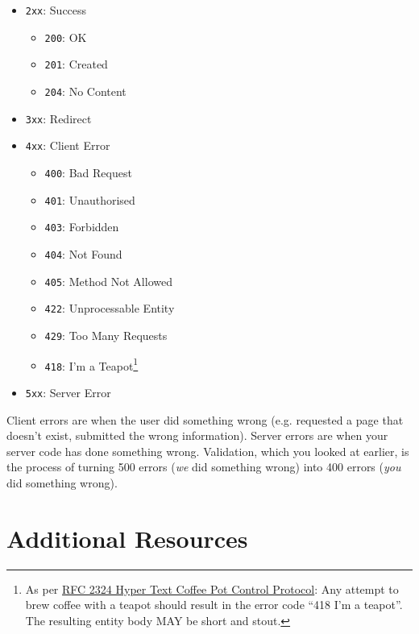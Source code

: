 \begin{itemize}
    \item \texttt{2xx}: Success
        \begin{itemize}
            \item \texttt{200}: OK
            \item \texttt{201}: Created
            \item \texttt{204}: No Content
        \end{itemize}

    \item \texttt{3xx}: Redirect

    \item \texttt{4xx}: Client Error
        \begin{itemize}
            \item \texttt{400}: Bad Request
            \item \texttt{401}: Unauthorised
            \item \texttt{403}: Forbidden
            \item \texttt{404}: Not Found
            \item \texttt{405}: Method Not Allowed
            \item \texttt{422}: Unprocessable Entity
            \item \texttt{429}: Too Many Requests
            \item \texttt{418}: I'm a Teapot\footnote{As per \href{https://tools.ietf.org/html/rfc2324\#section-2.3.2}{RFC 2324 Hyper Text Coffee Pot Control Protocol}: Any attempt to brew coffee with a teapot should result in the error code ``418 I'm a teapot''. The resulting entity body MAY be short and stout.}
        \end{itemize}

    \item \texttt{5xx}: Server Error
\end{itemize}

Client errors are when the user did something wrong (e.g. requested a page that doesn't exist, submitted the wrong information). Server errors are when your server code has done something wrong. Validation, which you looked at earlier, is the process of turning 500 errors (\textit{we} did something wrong) into 400 errors (\textit{you} did something wrong).


\section{Additional Resources}

